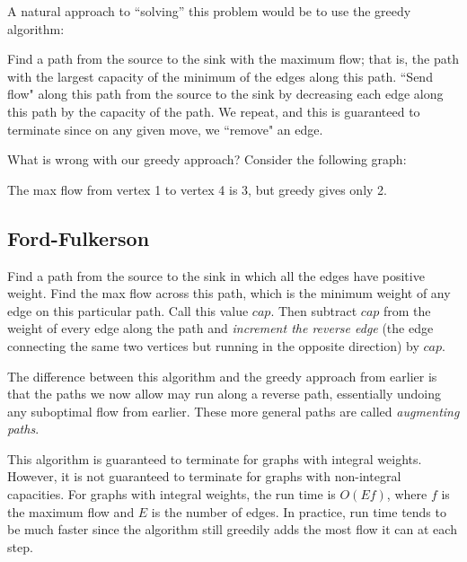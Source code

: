 \documentclass[11pt]{book}
\begin{document}
A natural approach to ``solving'' this problem would be to use the greedy algorithm:

Find a path from the source to the sink with the maximum flow; that is, the path with the largest capacity of the minimum of the edges along this path. ``Send flow" along this path from the source to the sink by decreasing each edge along this path by the capacity of the path. We repeat, and this is guaranteed to terminate since on any given move, we ``remove" an edge.

What is wrong with our greedy approach? Consider the following graph:

\begin{center}
\end{center}

The max flow from vertex 1 to vertex 4 is 3, but greedy gives only 2.

\subsection{Ford-Fulkerson}

Find a path from the source to the sink in which all the edges have positive weight. Find the max flow across this path, which is the minimum weight of any edge on this particular path. Call this value $cap$. Then subtract $cap$ from the weight of every edge along the path and \textit{increment the reverse edge} (the edge connecting the same two vertices but running in the opposite direction) by $cap$.

The difference between this algorithm and the greedy approach from earlier is that the paths we now allow may run along a reverse path, essentially undoing any suboptimal flow from earlier. These more general paths are called \textit{augmenting paths}.

This algorithm is guaranteed to terminate for graphs with integral weights. However, it is not guaranteed to terminate for graphs with non-integral capacities. For graphs with integral weights, the run time is $O(Ef)$, where $f$ is the maximum flow and $E$ is the number of edges. In practice, run time tends to be much faster since the algorithm still greedily adds the most flow it can at each step.
\end{document}
